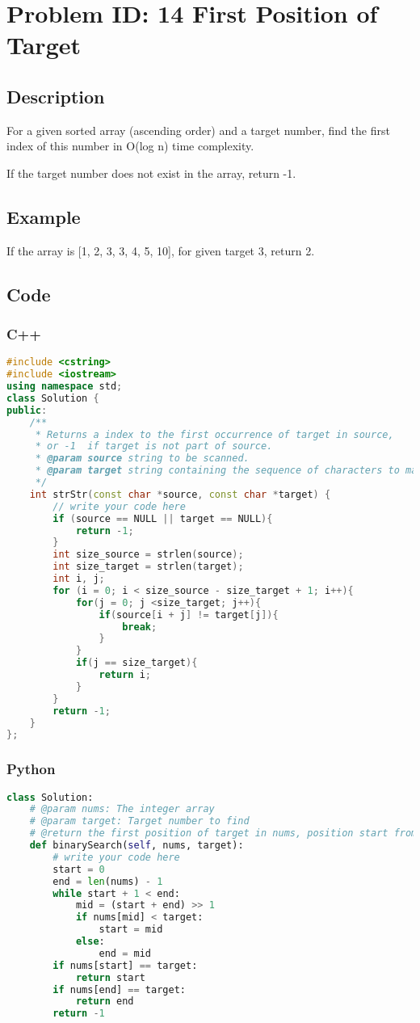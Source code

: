 \section{Problem ID: 14  First Position of Target}
\subsection{Description}
For a given sorted array (ascending order) and a target number, find the first index of this number in O(log n) time complexity.

If the target number does not exist in the array, return -1.

\subsection{Example}
If the array is [1, 2, 3, 3, 4, 5, 10], for given target 3, return 2.

\subsection{Code}
\scriptsize
\subsubsection{C++}
\begin{lstlisting}[language=C++]
#include <cstring>
#include <iostream>
using namespace std;
class Solution {
public:
    /**
     * Returns a index to the first occurrence of target in source,
     * or -1  if target is not part of source.
     * @param source string to be scanned.
     * @param target string containing the sequence of characters to match.
     */
    int strStr(const char *source, const char *target) {
        // write your code here
        if (source == NULL || target == NULL){
            return -1;
        }
        int size_source = strlen(source);
        int size_target = strlen(target);
        int i, j;
        for (i = 0; i < size_source - size_target + 1; i++){
            for(j = 0; j <size_target; j++){
                if(source[i + j] != target[j]){
                    break;
                }
            }
            if(j == size_target){
                return i;
            }
        }
        return -1;
    }
};
\end{lstlisting}

\subsubsection{Python}
\begin{lstlisting}[language=Python]
class Solution:
    # @param nums: The integer array
    # @param target: Target number to find
    # @return the first position of target in nums, position start from 0
    def binarySearch(self, nums, target):
        # write your code here
        start = 0
        end = len(nums) - 1
        while start + 1 < end:
            mid = (start + end) >> 1
            if nums[mid] < target:
                start = mid
            else:
                end = mid
        if nums[start] == target:
            return start
        if nums[end] == target:
            return end
        return -1
\end{lstlisting}
\normalsize 
